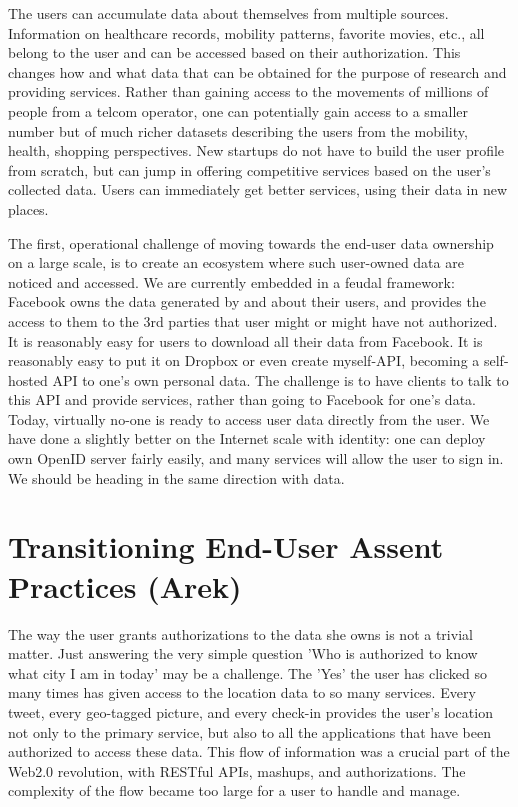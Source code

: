The users can accumulate data about themselves from multiple sources.
Information on healthcare records, mobility patterns, favorite movies, etc., all belong to the user and can be accessed based on their authorization.
This changes how and what data that can be obtained for the purpose of research and providing services.
Rather than gaining access to the movements of millions of people from a telcom operator, one can potentially gain access to a smaller number but of much richer datasets describing the users from the mobility, health, shopping perspectives.
New startups do not have to build the user profile from scratch, but can jump in offering competitive services based on the user's collected data.
Users can immediately get better services, using their data in new places.

The first, operational challenge of moving towards the end-user data ownership on a large scale, is to create an ecosystem where such user-owned data are noticed and accessed.
We are currently embedded in a feudal framework: Facebook owns the data generated by and about their users, and provides the access to them to the 3rd parties that user might or might have not authorized.
It is reasonably easy for users to download all their data from Facebook.
It is reasonably easy to put it on Dropbox or even create myself-API, becoming a self-hosted API to one's own personal data.
The challenge is to have clients to talk to this API and provide services, rather than going to Facebook for one's data.
Today, virtually no-one is ready to access user data directly from the user.
We have done a slightly better on the Internet scale with identity: one can deploy own OpenID server fairly easily, and many services will allow the user to sign in.
We should be heading in the same direction with data.

\section{Transitioning End-User Assent Practices (Arek)}

The way the user grants authorizations to the data she owns is not a trivial matter.
Just answering the very simple question 'Who is authorized to know what city I am in today' may be a challenge.
The 'Yes' the user has clicked so many times has given access to the location data to so many services.
Every tweet, every geo-tagged picture, and every check-in provides the user's location not only to the primary service, but also to all the applications that have been authorized to access these data.
This flow of information was a crucial part of the Web2.0 revolution, with RESTful APIs, mashups, and authorizations.
The complexity of the flow became too large for a user to handle and manage.

